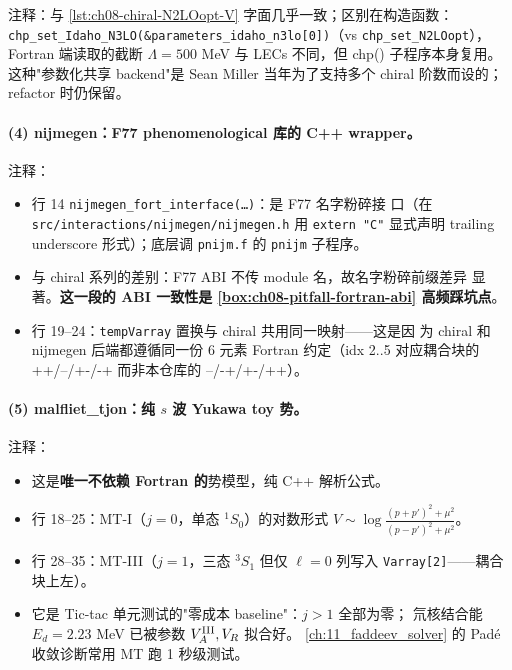 注释：与 \cref{lst:ch08-chiral-N2LOopt-V} 字面几乎一致；区别在构造函数：
\texttt{chp\_set\_Idaho\_N3LO(\&parameters\_idaho\_n3lo[0])}（vs
\texttt{chp\_set\_N2LOopt}），Fortran 端读取的截断 \(\Lambda = 500\) MeV 与
LECs 不同，但 chp() 子程序本身复用。这种"参数化共享 backend"是 Sean
Miller 当年为了支持多个 chiral 阶数而设的；refactor 时仍保留。

\paragraph{(4) nijmegen：F77 phenomenological 库的 C++ wrapper。}


注释：
\begin{itemize}
  \item 行 14 \texttt{nijmegen\_fort\_interface(\ldots)}：是 F77 名字粉碎接
        口（在 \texttt{src/interactions/nijmegen/nijmegen.h} 用
        \texttt{extern "C"} 显式声明 trailing underscore 形式）；底层调
        \texttt{pnijm.f} 的 \texttt{pnijm} 子程序。
  \item 与 chiral 系列的差别：F77 ABI 不传 module 名，故名字粉碎前缀差异
        显著。\textbf{这一段的 ABI 一致性是 \cref{box:ch08-pitfall-fortran-abi}
        高频踩坑点}。
  \item 行 19--24：\texttt{tempVarray} 置换与 chiral 共用同一映射——这是因
        为 chiral 和 nijmegen 后端都遵循同一份 6 元素 Fortran 约定（idx
        2..5 对应耦合块的 ++/--/+-/-+ 而非本仓库的 --/-+/+-/++）。
\end{itemize}

\paragraph{(5) malfliet\_tjon：纯 \(s\) 波 Yukawa toy 势。}


注释：
\begin{itemize}
  \item 这是\textbf{唯一不依赖 Fortran 的}势模型，纯 C++ 解析公式。
  \item 行 18--25：MT-I（\(j=0\)，单态 \({}^1S_0\)）的对数形式
        \(V \sim \log\!\frac{(p+p')^2 + \mu^2}{(p-p')^2 + \mu^2}\)。
  \item 行 28--35：MT-III（\(j=1\)，三态 \({}^3S_1\) 但仅 \(\ell = 0\) 列写入
        \texttt{Varray[2]}——耦合块上左）。
  \item 它是 Tic-tac 单元测试的"零成本 baseline"：\(j > 1\) 全部为零；
        氘核结合能 \(E_d = 2.23\) MeV 已被参数 \(V_A^{\rm III}, V_R\) 拟合好。
        \cref{ch:11_faddeev_solver} 的 Padé 收敛诊断常用 MT 跑 1 秒级测试。
\end{itemize}

